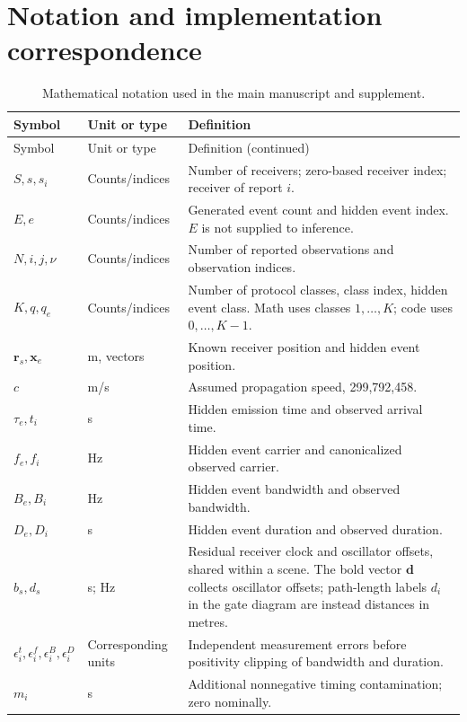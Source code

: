 \documentclass[10pt,a4paper]{article}
\begin{document}
\section{Notation and implementation correspondence}
\small\renewcommand{\arraystretch}{1.10}
\begin{longtable}{@{}>{\raggedright\arraybackslash}p{3.0cm}>{\raggedright\arraybackslash}p{2.5cm}>{\raggedright\arraybackslash}p{10.5cm}@{}}
\caption{Mathematical notation used in the main manuscript and supplement.}\label{tab:notation}\\
\toprule Symbol & Unit or type & Definition \\\midrule\endfirsthead
\toprule Symbol & Unit or type & Definition (continued) \\\midrule\endhead
\bottomrule\endfoot
$S,s,s_i$ & Counts/indices & Number of receivers; zero-based receiver index; receiver of report $i$. \\
$E,e$ & Counts/indices & Generated event count and hidden event index. $E$ is not supplied to inference. \\
$N,i,j,\nu$ & Counts/indices & Number of reported observations and observation indices. \\
$K,q,q_e$ & Counts/indices & Number of protocol classes, class index, hidden event class. Math uses classes $1,\ldots,K$; code uses $0,\ldots,K-1$. \\
$\mathbf r_s,\mathbf x_e$ & m, vectors & Known receiver position and hidden event position. \\
$c$ & m/s & Assumed propagation speed, 299,792,458. \\
$\tau_e,t_i$ & s & Hidden emission time and observed arrival time. \\
$f_e,f_i$ & Hz & Hidden event carrier and canonicalized observed carrier. \\
$B_e,B_i$ & Hz & Hidden event bandwidth and observed bandwidth. \\
$D_e,D_i$ & s & Hidden event duration and observed duration. \\
$b_s,d_s$ & s; Hz & Residual receiver clock and oscillator offsets, shared within a scene. The bold vector $\mathbf d$ collects oscillator offsets; path-length labels $d_i$ in the gate diagram are instead distances in metres. \\
$\epsilon_i^t,\epsilon_i^f,\epsilon_i^B,\epsilon_i^D$ & Corresponding units & Independent measurement errors before positivity clipping of bandwidth and duration. \\
$m_i$ & s & Additional nonnegative timing contamination; zero nominally. \\

\end{longtable}
\end{document}
